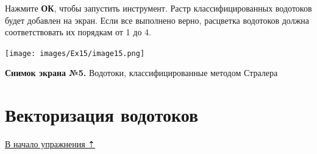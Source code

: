 \documentclass[12pt,]{book}
\begin{document}
\begin{enumerate}
  Нажмите \textbf{ОК}, чтобы запустить инструмент. Растр классифицированных водотоков будет добавлен на экран. Если все выполнено верно, расцветка водотоков должна соответствовать их порядкам от 1 до 4.

  \texttt{[image: images/Ex15/image15.png]}

  \textbf{Снимок экрана №5.} Водотоки, классифицированные методом Стралера
\end{enumerate}

\hypertarget{dem-vectorize}{%
\section{Векторизация водотоков}\label{dem-vectorize}}

\protect\hyperlink{dem}{В начало упражнения ⇡}
\end{document}
